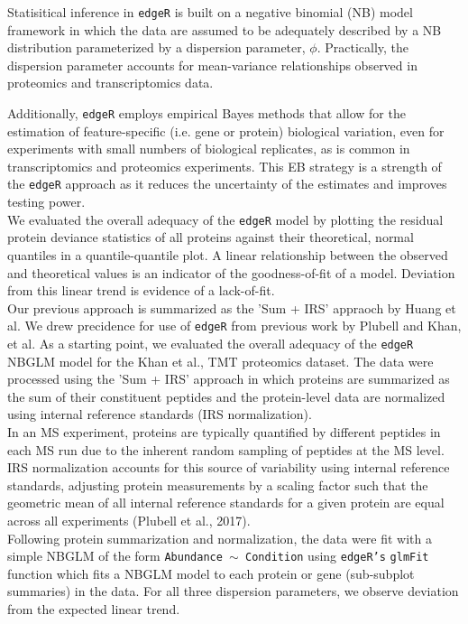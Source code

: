 \documentclass[11pt]{elife}\usepackage[]{graphicx}\usepackage[]{color}
\begin{document}
Statisitical inference in \texttt{edgeR} is built on a 
negative binomial (NB) model framework in which the data are assumed to be 
adequately described by a NB distribution parameterized by a dispersion 
parameter, $\phi$. Practically, the dispersion parameter accounts for 
mean-variance relationships observed in proteomics and transcriptomics data. 

Additionally, \texttt{edgeR} employs empirical Bayes methods that allow for the 
estimation of feature-specific (i.e. gene or protein) biological variation, 
even for experiments with small numbers of biological replicates, as is common 
in transcriptomics and proteomics experiments. This EB strategy is a strength of
the \texttt{edgeR} approach as it reduces the uncertainty of the estimates and 
improves testing power. \\

We evaluated the overall adequacy of the \texttt{edgeR} model by plotting the 
residual protein deviance statistics of all proteins against their theoretical, 
normal quantiles in a quantile-quantile plot. A linear relationship between the
observed and theoretical values is an indicator of the goodness-of-fit of a
model. Deviation from this linear trend is evidence of a lack-of-fit. \\

Our previous approach is summarized as the 'Sum + IRS' appraoch by Huang et al.
We drew precidence for use of \texttt{edgeR} from previous work by Plubell and 
Khan, et al. As a starting point, we evaluated the overall adequacy of the 
\texttt{edgeR} NBGLM model for the Khan et al., TMT proteomics dataset. The data
were processed using the 'Sum + IRS' approach in which proteins are summarized as the sum of their constituent peptides and the protein-level data are normalized 
using  internal reference standards (IRS normalization).  \\

In an MS experiment, proteins are typically quantified by different peptides 
in each MS run due to the inherent random sampling of peptides at the MS level.
IRS normalization accounts for this source of variability using internal
reference standards, adjusting protein measurements by a scaling factor such 
that the geometric mean of all internal reference standards for a given protein
are equal across all experiments (Plubell et al., 2017). \\

Following protein summarization and normalization, the data were fit with 
a simple NBGLM of the form \texttt{Abundance $\sim$ Condition} using
\texttt{edgeR's} \texttt{glmFit} function which fits a NBGLM model to each
protein or gene (sub-subplot summaries) in the data. For all three dispersion 
parameters, we observe deviation from the expected linear trend. \\
\end{document}
